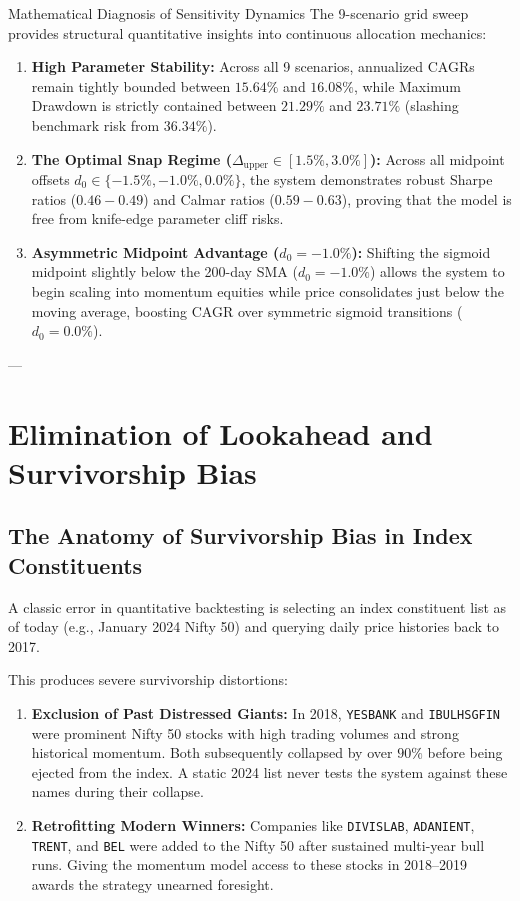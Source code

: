\documentclass[11pt,a4paper]{article}
\begin{document}
\begin{quantbox}{Mathematical Diagnosis of Sensitivity Dynamics}
The 9-scenario grid sweep provides structural quantitative insights into continuous allocation mechanics:
\begin{enumerate}[leftmargin=*]
    \item \textbf{High Parameter Stability:} Across all 9 scenarios, annualized CAGRs remain tightly bounded between $15.64\%$ and $16.08\%$, while Maximum Drawdown is strictly contained between $21.29\%$ and $23.71\%$ (slashing benchmark risk from $36.34\%$).
    \item \textbf{The Optimal Snap Regime ($\Delta_{\text{upper}} \in [1.5\%, 3.0\%]$):} Across all midpoint offsets $d_0 \in \{-1.5\%, -1.0\%, 0.0\%\}$, the system demonstrates robust Sharpe ratios ($0.46 - 0.49$) and Calmar ratios ($0.59 - 0.63$), proving that the model is free from knife-edge parameter cliff risks.
    \item \textbf{Asymmetric Midpoint Advantage ($d_0 = -1.0\%$):} Shifting the sigmoid midpoint slightly below the 200-day SMA ($d_0 = -1.0\%$) allows the system to begin scaling into momentum equities while price consolidates just below the moving average, boosting CAGR over symmetric sigmoid transitions ($d_0 = 0.0\%$).
\end{enumerate}
\end{quantbox}

---

\section{Elimination of Lookahead and Survivorship Bias}

\subsection{The Anatomy of Survivorship Bias in Index Constituents}
A classic error in quantitative backtesting is selecting an index constituent list as of today (e.g., January 2024 Nifty 50) and querying daily price histories back to 2017.

This produces severe survivorship distortions:
\begin{enumerate}
    \item \textbf{Exclusion of Past Distressed Giants:} In 2018, \texttt{YESBANK} and \texttt{IBULHSGFIN} were prominent Nifty 50 stocks with high trading volumes and strong historical momentum. Both subsequently collapsed by over $90\%$ before being ejected from the index. A static 2024 list never tests the system against these names during their collapse.
    \item \textbf{Retrofitting Modern Winners:} Companies like \texttt{DIVISLAB}, \texttt{ADANIENT}, \texttt{TRENT}, and \texttt{BEL} were added to the Nifty 50 after sustained multi-year bull runs. Giving the momentum model access to these stocks in 2018--2019 awards the strategy unearned foresight.
\end{enumerate}
\end{document}
